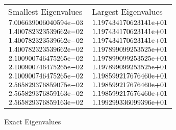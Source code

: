 \begin{enumerate}
\begin{figure} 
 \centering    
\begin{tabular}{ ||p{6cm}||p{6cm}|}
\hline
 Smallest Eigenvalues & Largest Eigenvalues \\ \hhline{|=|=|}    
\hline
${7.006639006040594}\mathrm{e}{-03}$ & ${1.197434170623141}\mathrm{e}{+01}$ \\  
${1.400782323539662}\mathrm{e}{-02}$ & ${1.197434170623141}\mathrm{e}{+01}$ \\  
${1.400782323539662}\mathrm{e}{-02}$ & ${1.197434170623141}\mathrm{e}{+01}$ \\  
${1.400782323539662}\mathrm{e}{-02}$ & ${1.197899099253525}\mathrm{e}{+01}$ \\  
${2.100900746475265}\mathrm{e}{-02}$ & ${1.197899099253525}\mathrm{e}{+01}$ \\  
${2.100900746475265}\mathrm{e}{-02}$ & ${1.197899099253525}\mathrm{e}{+01}$ \\  
${2.100900746475265}\mathrm{e}{-02}$ & ${1.198599217676460}\mathrm{e}{+01}$ \\  
${2.565829376859075}\mathrm{e}{-02}$ & ${1.198599217676460}\mathrm{e}{+01}$ \\  
${2.565829376859163}\mathrm{e}{-02}$ & ${1.198599217676460}\mathrm{e}{+01}$ \\  
${2.565829376859163}\mathrm{e}{-02}$ & ${1.199299336099396}\mathrm{e}{+01}$ \\  
\hline  
\end{tabular} 
\caption{Exact Eigenvalues}
   \label{tab:exact64}
\end{figure} 

\end{enumerate}